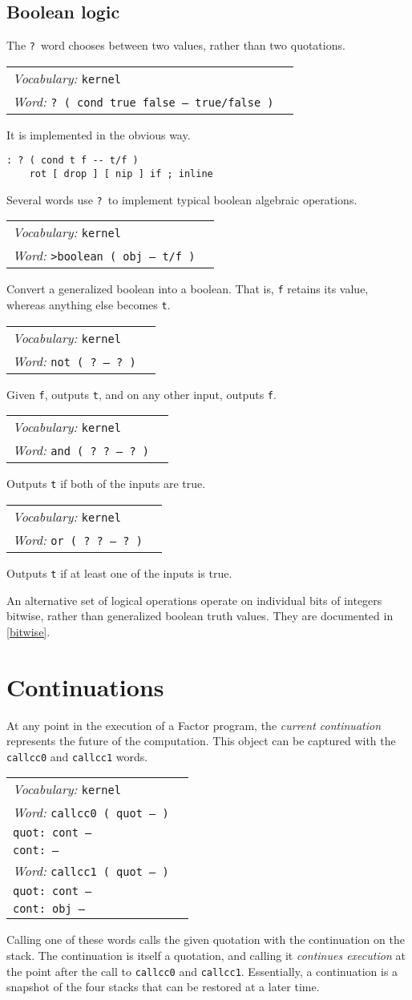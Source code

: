 \documentclass{book}
\newcommand{\vocabulary}[1]{\emph{Vocabulary:} \texttt{#1}&\\}
\newcommand{\ordinaryword}[2]{\index{\texttt{#1}}\emph{Word:} \texttt{#2}&\\}
\newcommand{\wordtable}[1]{


\begin{tabularx}{12cm}{lX}
\hline
#1
\hline
\end{tabularx}

}
\begin{document}
\subsection{Boolean logic}

The \texttt{?}~word chooses between two values, rather than two quotations.
\wordtable{
\vocabulary{kernel}
\ordinaryword{?}{?~( cond true false -- true/false )}
}
It is implemented in the obvious way.
\begin{verbatim}
: ? ( cond t f -- t/f )
    rot [ drop ] [ nip ] if ; inline
\end{verbatim}
Several words use \texttt{?}~to implement typical boolean algebraic operations.
\wordtable{
\vocabulary{kernel}
\ordinaryword{>boolean}{>boolean ( obj -- t/f )}
}
Convert a generalized boolean into a boolean. That is, \texttt{f} retains its value, whereas anything else becomes \texttt{t}.
\wordtable{
\vocabulary{kernel}
\ordinaryword{not}{not ( ?~-- ?~)}
}
Given \texttt{f}, outputs \texttt{t}, and on any other input, outputs \texttt{f}.
\wordtable{
\vocabulary{kernel}
\ordinaryword{and}{and ( ?~?~-- ?~)}
}
Outputs \texttt{t} if both of the inputs are true.
\wordtable{
\vocabulary{kernel}
\ordinaryword{or}{or ( ?~?~-- ?~)}
}
Outputs \texttt{t} if at least one of the inputs is true.

An alternative set of logical operations operate on individual bits of integers bitwise, rather than generalized boolean truth values. They are documented in \ref{bitwise}.

\section{Continuations}

\newcommand{\contglos}{
}
\contglos
At any point in the execution of a Factor program, the \emph{current continuation} represents the future of the computation. This object can be captured with the \texttt{callcc0} and \texttt{callcc1} words.
\wordtable{
\vocabulary{kernel}
\ordinaryword{callcc0}{callcc0 ( quot -- )}
\texttt{quot:~cont --}\\
\texttt{cont:~--}\\
\ordinaryword{callcc1}{callcc1 ( quot -- )}
\texttt{quot:~cont --}\\
\texttt{cont:~obj --}\\
}
Calling one of these words calls the given quotation with the continuation on the stack. The continuation is itself a quotation, and calling it \emph{continues execution} at the point after the call to \texttt{callcc0} and \texttt{callcc1}. Essentially, a continuation is a snapshot of the four stacks that can be restored at a later time.
\end{document}
